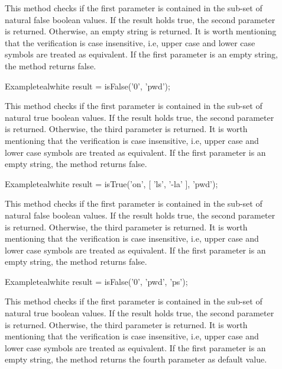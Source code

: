 \begin{description}
\item[] This method checks if the first parameter is contained in the sub-set of natural false boolean values. If the result holds true, the second parameter is returned. Otherwise, an empty string is returned. It is worth mentioning that the verification is case insensitive, i.e, upper case and lower case symbols are treated as equivalent. If the first parameter is an empty string, the method returns false.

\begin{codebox}{Example}{teal}{\icnote}{white}
result = isFalse('0', 'pwd');
\end{codebox}

\item[] This method checks if the first parameter is contained in the sub-set of natural true boolean values. If the result holds true, the second parameter is returned. Otherwise, the third parameter is returned. It is worth mentioning that the verification is case insensitive, i.e, upper case and lower case symbols are treated as equivalent. If the first parameter is an empty string, the method returns false.

\begin{codebox}{Example}{teal}{\icnote}{white}
result = isTrue('on', [ 'ls', '-la' ], 'pwd');
\end{codebox}

\item[] This method checks if the first parameter is contained in the sub-set of natural false boolean values. If the result holds true, the second parameter is returned. Otherwise, the third parameter is returned. It is worth mentioning that the verification is case insensitive, i.e, upper case and lower case symbols are treated as equivalent. If the first parameter is an empty string, the method returns false.

\begin{codebox}{Example}{teal}{\icnote}{white}
result = isFalse('0', 'pwd', 'ps');
\end{codebox}

\item[] This method checks if the first parameter is contained in the sub-set of natural true boolean values. If the result holds true, the second parameter is returned. Otherwise, the third parameter is returned. It is worth mentioning that the verification is case insensitive, i.e, upper case and lower case symbols are treated as equivalent. If the first parameter is an empty string, the method returns the fourth parameter as default value.


\end{description}
